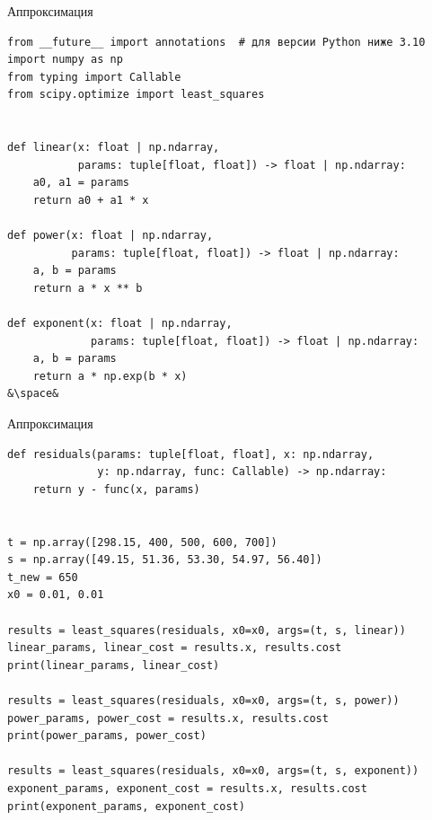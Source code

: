 \documentclass[aspectratio=169, mathserif]{beamer}	%
\begin{document}
\begin{frame}[fragile]{Аппроксимация}
\scriptsize
\begin{verbatim}
from __future__ import annotations  # для версии Python ниже 3.10
import numpy as np
from typing import Callable
from scipy.optimize import least_squares


def linear(x: float | np.ndarray,
           params: tuple[float, float]) -> float | np.ndarray:
    a0, a1 = params
    return a0 + a1 * x

def power(x: float | np.ndarray,
          params: tuple[float, float]) -> float | np.ndarray:
    a, b = params
    return a * x ** b

def exponent(x: float | np.ndarray,
             params: tuple[float, float]) -> float | np.ndarray:
    a, b = params
    return a * np.exp(b * x)
&\space&
\end{verbatim}
\vfill
\end{frame}


\begin{frame}[fragile]{Аппроксимация}
\scriptsize
\begin{verbatim}
def residuals(params: tuple[float, float], x: np.ndarray,
              y: np.ndarray, func: Callable) -> np.ndarray:
    return y - func(x, params)


t = np.array([298.15, 400, 500, 600, 700])
s = np.array([49.15, 51.36, 53.30, 54.97, 56.40])
t_new = 650
x0 = 0.01, 0.01

results = least_squares(residuals, x0=x0, args=(t, s, linear))
linear_params, linear_cost = results.x, results.cost
print(linear_params, linear_cost)

results = least_squares(residuals, x0=x0, args=(t, s, power))
power_params, power_cost = results.x, results.cost
print(power_params, power_cost)

results = least_squares(residuals, x0=x0, args=(t, s, exponent))
exponent_params, exponent_cost = results.x, results.cost
print(exponent_params, exponent_cost)
\end{verbatim}
\vfill
\end{frame}
\end{document}
